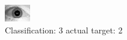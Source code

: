 \begin{figure}[h!]
\begin{center}
\includegraphics[width=0.60\columnwidth]{figures/ID1631_class_3_target_2.png}
\end{center}
\caption{ Classification: 3 actual target: 2}
\label{fig:ID1631_class_3_target_2}
\end{figure}

